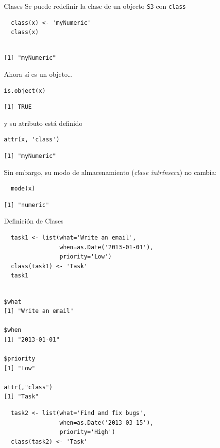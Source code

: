 \documentclass[xcolor={usenames,svgnames,dvipsnames}]{beamer}
\begin{document}
\begin{frame}[label={sec:orgf21f78e},fragile]{Clases}
 Se puede redefinir la clase de un objecto \texttt{S3} con \texttt{class}
\lstset{language=r,label= ,caption= ,captionpos=b,numbers=none}
\begin{lstlisting}
  class(x) <- 'myNumeric'
  class(x)
\end{lstlisting}

\begin{verbatim}

[1] "myNumeric"
\end{verbatim}


Ahora sí es un objeto\ldots{} 
\lstset{language=r,label= ,caption= ,captionpos=b,numbers=none}
\begin{lstlisting}
is.object(x)
\end{lstlisting}

\begin{verbatim}
[1] TRUE
\end{verbatim}


y su atributo está definido
\lstset{language=r,label= ,caption= ,captionpos=b,numbers=none}
\begin{lstlisting}
attr(x, 'class')
\end{lstlisting}

\begin{verbatim}
[1] "myNumeric"
\end{verbatim}


Sin embargo, su modo de almacenamiento (\emph{clase intrínseca}) no cambia:
\lstset{language=r,label= ,caption= ,captionpos=b,numbers=none}
\begin{lstlisting}
  mode(x)
\end{lstlisting}

\begin{verbatim}
[1] "numeric"
\end{verbatim}
\end{frame}

\begin{frame}[label={sec:org25d53df},fragile]{Definición de Clases}
 \lstset{language=r,label= ,caption= ,captionpos=b,numbers=none}
\begin{lstlisting}
  task1 <- list(what='Write an email',
                when=as.Date('2013-01-01'),
                priority='Low')
  class(task1) <- 'Task'
  task1
\end{lstlisting}

\begin{verbatim}

$what
[1] "Write an email"

$when
[1] "2013-01-01"

$priority
[1] "Low"

attr(,"class")
[1] "Task"
\end{verbatim}

\lstset{language=r,label= ,caption= ,captionpos=b,numbers=none}
\begin{lstlisting}
  task2 <- list(what='Find and fix bugs',
                when=as.Date('2013-03-15'),
                priority='High')
  class(task2) <- 'Task'
\end{lstlisting}
\end{frame}
\end{document}
